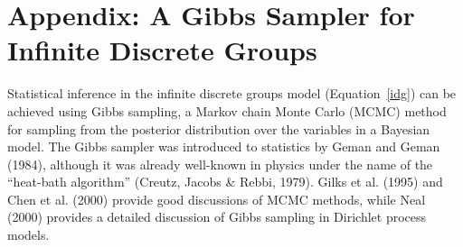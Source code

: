 \documentclass[authoryear]{elsarticle}
\begin{document}
\section*{Appendix: A Gibbs Sampler for Infinite Discrete Groups}

Statistical inference in the infinite discrete groups model (Equation~\ref{idg})
can be achieved using  Gibbs sampling, a Markov chain Monte Carlo (MCMC)
method for sampling from the posterior distribution over the variables in
a Bayesian model. The Gibbs sampler was introduced to statistics by
Geman and Geman (1984), although it was already well-known in physics
under the name of the ``heat-bath algorithm'' (Creutz, Jacobs \& Rebbi, 1979).
Gilks et al. (1995) and Chen et al. (2000) provide good discussions of MCMC
methods, while Neal (2000) provides a detailed discussion of Gibbs sampling
in Dirichlet process models.
\end{document}
